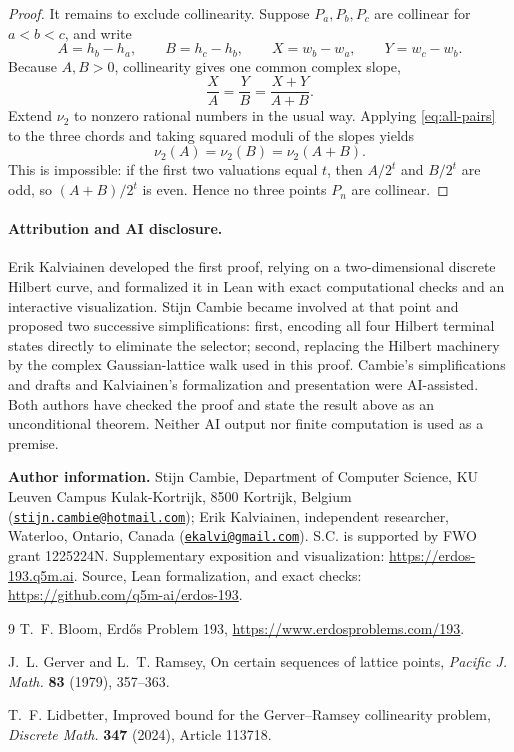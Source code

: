 \documentclass[10pt]{article}
\newcommand{\vTwo}{\nu_2}
\begin{document}
\begin{proof}
It remains to exclude collinearity.  Suppose $P_a,P_b,P_c$ are collinear for
$a<b<c$, and write
\[
 A=h_b-h_a,\qquad B=h_c-h_b,
 \qquad X=w_b-w_a,\qquad Y=w_c-w_b.
\]
Because $A,B>0$, collinearity gives one common complex slope,
\[
 \frac XA=\frac YB=\frac{X+Y}{A+B}.
\]
Extend $\vTwo$ to nonzero rational numbers in the usual way.  Applying
\eqref{eq:all-pairs} to the three chords and taking squared moduli of the
slopes yields
\[
 \vTwo(A)=\vTwo(B)=\vTwo(A+B).
\]
This is impossible: if the first two valuations equal $t$, then $A/2^t$ and
$B/2^t$ are odd, so $(A+B)/2^t$ is even.  Hence no three points $P_n$ are
collinear.
\end{proof}

\paragraph{Attribution and AI disclosure.}
Erik Kalviainen developed the first proof, relying on a two-dimensional
discrete Hilbert curve, and formalized it in Lean with exact computational
checks and an interactive visualization.  Stijn Cambie became involved at that
point and proposed two successive simplifications: first, encoding all four
Hilbert terminal states directly to eliminate the selector; second, replacing
the Hilbert machinery by the complex Gaussian-lattice walk used in this proof.
Cambie's simplifications and drafts and Kalviainen's formalization and
presentation were AI-assisted.  Both authors have checked the proof and state
the result above as an unconditional theorem.  Neither AI output nor finite
computation is used as a premise.

{\footnotesize\raggedright
\noindent\textbf{Author information.}
Stijn Cambie, Department of Computer Science, KU Leuven Campus
Kulak-Kortrijk, 8500 Kortrijk, Belgium
(\href{mailto:stijn.cambie@hotmail.com}{\nolinkurl{stijn.cambie@hotmail.com}});
Erik Kalviainen, independent researcher, Waterloo, Ontario, Canada
(\href{mailto:ekalvi@gmail.com}{\nolinkurl{ekalvi@gmail.com}}).
S.C. is supported by FWO grant 1225224N.
Supplementary exposition and visualization: \url{https://erdos-193.q5m.ai}.
Source, Lean formalization, and exact checks:
\url{https://github.com/q5m-ai/erdos-193}.\par}

\begin{thebibliography}{9}
T.~F. Bloom, Erd\H{o}s Problem 193,
\url{https://www.erdosproblems.com/193}.

J.~L. Gerver and L.~T. Ramsey,
On certain sequences of lattice points,
\emph{Pacific J. Math.} \textbf{83} (1979), 357--363.

T.~F. Lidbetter,
Improved bound for the Gerver--Ramsey collinearity problem,
\emph{Discrete Math.} \textbf{347} (2024), Article 113718.
\end{thebibliography}
\end{document}
